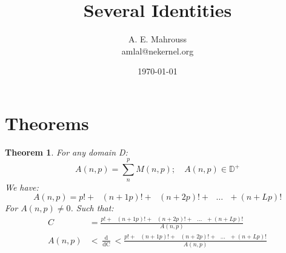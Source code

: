 \documentclass[10pt, twocolumn]{article}
\title{%
  \vspace{-1.5em}%
  \large\textbf{Several Identities}%
}
\author{A. E. Mahrouss\\amlal@nekernel.org}
\date{\today}
\theoremstyle{plain}
\newtheorem{theorem}{Theorem}[section]
\theoremstyle{definition}
\theoremstyle{remark}
\begin{document}
\twocolumn[{%
  \maketitle
  \vspace{-0.5em}
  \vspace{0.8em}
  \rule{\linewidth}{0.4pt}
  \vspace{1em}
}]


\section{Theorems}

\begin{theorem}
For any domain D:
\begin{equation}
    A(n, p) = \sum_{n}^{p} M(n, p); \quad A(n, p) \in \mathbb{D}^{+}
\end{equation}
We have:
\begin{equation}
    A(n, p) = p! + \text{ } (n+1p)! + \text{ } (n+2p)! + \text{ } \dots \text{ } + (n+Lp)! 
\end{equation}
For $A(n, p) \neq 0$. Such that:
\begin{align*}
    C &=  \frac{ p! + \text{ } (n+1p)! + \text{ } (n+2p)! + \text{ } \dots \text{ } + (n+Lp)!}{A(n, p)}\\
    A(n, p) &< \frac{\operatorname{d}}{\operatorname{dC}} < \frac{ p! + \text{ } (n+1p)! + \text{ } (n+2p)! + \text{ } \dots \text{ } + (n+Lp)!}{A(n, p)}
\end{align*}
\end{theorem}

\nocite{*}



\end{document}
